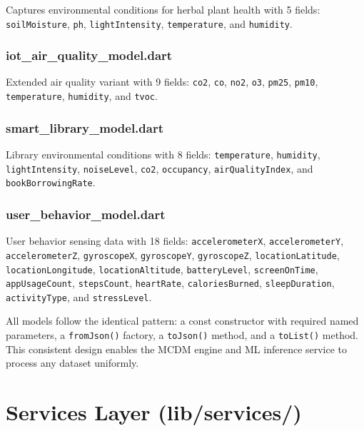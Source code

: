 \documentclass[12pt,a4paper,oneside]{report}
\newcommand{\code}[1]{\texttt{#1}}
\begin{document}
Captures environmental conditions for herbal plant health with 5 fields: \code{soilMoisture}, \code{ph}, \code{lightIntensity}, \code{temperature}, and \code{humidity}.

\subsection{iot\_air\_quality\_model.dart}

Extended air quality variant with 9 fields: \code{co2}, \code{co}, \code{no2}, \code{o3}, \code{pm25}, \code{pm10}, \code{temperature}, \code{humidity}, and \code{tvoc}.

\subsection{smart\_library\_model.dart}

Library environmental conditions with 8 fields: \code{temperature}, \code{humidity}, \code{lightIntensity}, \code{noiseLevel}, \code{co2}, \code{occupancy}, \code{airQualityIndex}, and \code{bookBorrowingRate}.

\subsection{user\_behavior\_model.dart}

User behavior sensing data with 18 fields: \code{accelerometerX}, \code{accelerometerY}, \code{accelerometerZ}, \code{gyroscopeX}, \code{gyroscopeY}, \code{gyroscopeZ}, \code{locationLatitude}, \code{locationLongitude}, \code{locationAltitude}, \code{batteryLevel}, \code{screenOnTime}, \code{appUsageCount}, \code{stepsCount}, \code{heartRate}, \code{caloriesBurned}, \code{sleepDuration}, \code{activityType}, and \code{stressLevel}.

All models follow the identical pattern: a const constructor with required named parameters, a \code{fromJson()} factory, a \code{toJson()} method, and a \code{toList()} method. This consistent design enables the MCDM engine and ML inference service to process any dataset uniformly.

\chapter{Services Layer (lib/services/)}
\label{ch:services}
\end{document}
